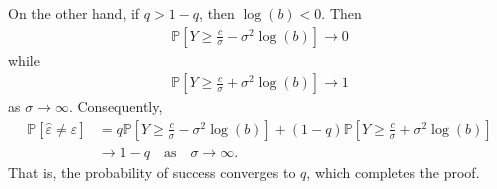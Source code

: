 \documentclass{article}
\theoremstyle{thm}
\theoremstyle{definition}
\newcommand{\ep}{\varepsilon}
\newcommand{\1}{\mathbf{1}}
\renewcommand{\P}{\mathbb{P}}
\begin{document}
On the other hand, if $q > 1-q$, then $\log(b) < 0$. Then 
%
\begin{align}
%
\P\left[Y \ge \frac{c}{\sigma} - \sigma^2 \log(b) \right] \longrightarrow 0
%
\end{align}
%
while
%
\begin{align}
%
\P\left[Y \ge \frac{c}{\sigma} + \sigma^2 \log(b) \right] \longrightarrow 1
%
\end{align}
%
as $\sigma \to \infty$. Consequently,
%
\begin{align}
%
\P[\hat{\ep} \ne \ep]
&= q \P\left[Y \ge \frac{c}{\sigma} - \sigma^2 \log(b) \right]
    + (1-q) \P\left[Y \ge \frac{c}{\sigma} + \sigma^2 \log(b) \right]
    \nonumber\\
& \longrightarrow 1-q  \quad \text{as} \quad  \sigma \to \infty.
%
\end{align}
%
That is, the probability of success converges to $q$, which completes the proof.



\end{document}
